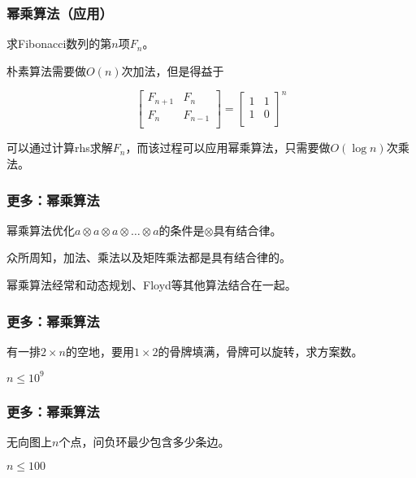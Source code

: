 \documentclass{ctexbeamer}
\begin{document}
    \begin{frame}
        \frametitle{幂乘算法（应用）}

        求Fibonacci数列的第$n$项$F_n$。

        朴素算法需要做$O(n)$次加法，但是得益于

        $$
        \begin{bmatrix}
            F_{n+1} & F_{n} \\
            F_{n} & F_{n-1} \\
        \end{bmatrix}
        =
        \begin{bmatrix}
            1 & 1 \\
            1 & 0 \\
        \end{bmatrix} ^ n
        $$

        可以通过计算rhs求解$F_n$，而该过程可以应用幂乘算法，只需要做$O(\log n)$次乘法。

    \end{frame}



    \begin{frame}
        \frametitle{更多：幂乘算法}

        幂乘算法优化$a\otimes a\otimes a\otimes \ldots \otimes a$的条件是$\otimes$具有结合律。
        
        众所周知，加法、乘法以及矩阵乘法都是具有结合律的。

        幂乘算法经常和动态规划、Floyd等其他算法结合在一起。

    \end{frame}

    \begin{frame}
        \frametitle{更多：幂乘算法}

        有一排$2\times n$的空地，要用$1\times 2$的骨牌填满，骨牌可以旋转，求方案数。

        $n\leq 10^9$

    \end{frame}

    \begin{frame}
        \frametitle{更多：幂乘算法}

        无向图上$n$个点，问负环最少包含多少条边。

        $n\leq 100$

    \end{frame}
\end{document}
